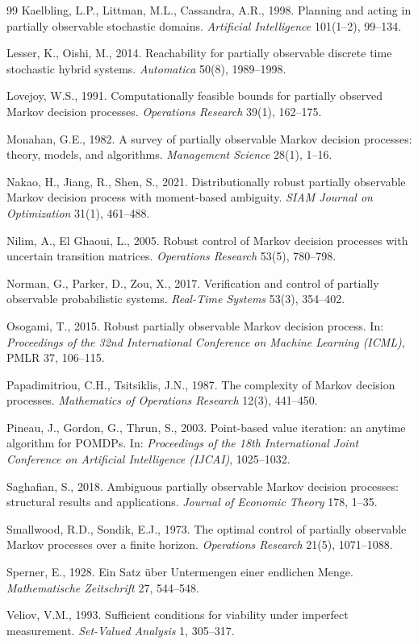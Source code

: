 \begin{thebibliography}{99}
 Kaelbling, L.P., Littman, M.L., Cassandra, A.R., 1998. Planning and acting in partially observable stochastic domains. \emph{Artificial Intelligence} 101(1--2), 99--134.

 Lesser, K., Oishi, M., 2014. Reachability for partially observable discrete time stochastic hybrid systems. \emph{Automatica} 50(8), 1989--1998.

 Lovejoy, W.S., 1991. Computationally feasible bounds for partially observed Markov decision processes. \emph{Operations Research} 39(1), 162--175.

 Monahan, G.E., 1982. A survey of partially observable Markov decision processes: theory, models, and algorithms. \emph{Management Science} 28(1), 1--16.

 Nakao, H., Jiang, R., Shen, S., 2021. Distributionally robust partially observable Markov decision process with moment-based ambiguity. \emph{SIAM Journal on Optimization} 31(1), 461--488.

 Nilim, A., El Ghaoui, L., 2005. Robust control of Markov decision processes with uncertain transition matrices. \emph{Operations Research} 53(5), 780--798.

 Norman, G., Parker, D., Zou, X., 2017. Verification and control of partially observable probabilistic systems. \emph{Real-Time Systems} 53(3), 354--402.

 Osogami, T., 2015. Robust partially observable Markov decision process. In: \emph{Proceedings of the 32nd International Conference on Machine Learning (ICML)}, PMLR 37, 106--115.

 Papadimitriou, C.H., Tsitsiklis, J.N., 1987. The complexity of Markov decision processes. \emph{Mathematics of Operations Research} 12(3), 441--450.

 Pineau, J., Gordon, G., Thrun, S., 2003. Point-based value iteration: an anytime algorithm for POMDPs. In: \emph{Proceedings of the 18th International Joint Conference on Artificial Intelligence (IJCAI)}, 1025--1032.

 Saghafian, S., 2018. Ambiguous partially observable Markov decision processes: structural results and applications. \emph{Journal of Economic Theory} 178, 1--35.

 Smallwood, R.D., Sondik, E.J., 1973. The optimal control of partially observable Markov processes over a finite horizon. \emph{Operations Research} 21(5), 1071--1088.

 Sperner, E., 1928. Ein Satz \"uber Untermengen einer endlichen Menge. \emph{Mathematische Zeitschrift} 27, 544--548.

 Veliov, V.M., 1993. Sufficient conditions for viability under imperfect measurement. \emph{Set-Valued Analysis} 1, 305--317.

\end{thebibliography}


